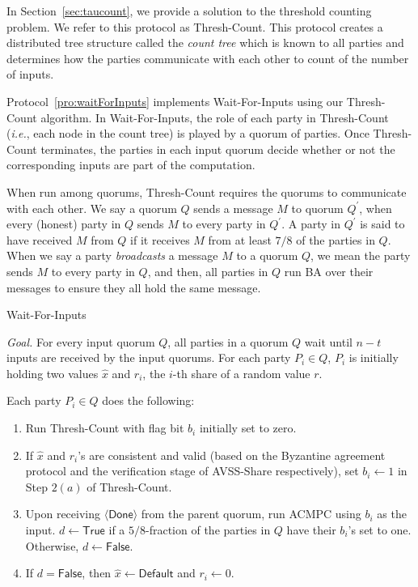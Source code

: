 \documentclass[11pt,letter]{article}
\newcommand{\ie}{\emph{i.e.}}
\newcommand{\alg}[1]{\mbox{\textsf{#1}}}
\newcommand{\mask}[1]{\widehat{#1}}
\theoremstyle{mytheoremstyle}
\let\savedCaption=\caption
\renewcommand*{\caption}[1]{\savedCaption[#1]{~#1}}
\newcommand{\algfont}{}
\newcommand{\fgoodq}{7/8\xspace}
\newcommand{\done}{$\langle\mathsf{Done}\rangle$\xspace}
\newcommand{\ba}{\mbox{\textsf{BA}}\xspace}
\begin{document}
In Section~\ref{sec:taucount}, we provide a solution to the threshold counting problem. We refer to this protocol as \alg{Thresh-Count}. This protocol creates a distributed tree structure called the \emph{count tree} which is known to all parties and determines how the parties communicate with each other to count of the number of inputs.

Protocol~\ref{pro:waitForInputs} implements \textsf{Wait-For-Inputs} using our \alg{Thresh-Count} algorithm. In \alg{Wait-For-Inputs}, the role of each party in \alg{Thresh-Count} (\ie, each node in the count tree) is played by a quorum of parties. Once \alg{Thresh-Count} terminates, the parties in each input quorum decide whether or not the corresponding inputs are part of the computation.

When run among quorums, \alg{Thresh-Count} requires the quorums to communicate with each other. We say a quorum $Q$ sends a message $M$ to quorum $Q^\prime$, when every (honest) party in $Q$ sends $M$ to every party in $Q^\prime$. A party in $Q^\prime$ is said to have received $M$ from $Q$ if it receives $M$ from at least $\fgoodq$ of the parties in $Q$. When we say a party \emph{broadcasts} a message $M$ to a quorum $Q$, we mean the party sends $M$ to every party in $Q$, and then, all parties in $Q$ run \ba over their messages to ensure they all hold the same message. 

\begin{algorithm}
	\caption{\alg{Wait-For-Inputs}}\label{pro:waitForInputs}
	\medskip
	\algfont
	\textit{Goal.} For every input quorum $Q$, all parties in a quorum $Q$ wait until $n-t$ inputs are received by the input quorums. For each party $P_i \in Q$, $P_i$ is initially
	holding two values $\mask{x}$ and $r_i$, the $i$-th share of a random value $r$.
	
	\medskip
	Each party $P_i \in Q$ does the following:
	\smallskip
	\begin{enumerate}
		\item Run \alg{Thresh-Count} with flag bit $b_i$ initially set to zero.
		
		\item If $\mask{x}$ and $r_i$'s are consistent and valid (based on the Byzantine agreement protocol and the verification stage of \alg{AVSS-Share} respectively), set $b_i \gets 1$ in Step $2(a)$ of \alg{Thresh-Count}.
		
		\item Upon receiving \done from the parent quorum, run \alg{ACMPC} using $b_i$ as the input. $d \gets \textsf{True}$ if a $5/8$-fraction of the parties in $Q$ have their $b_i$'s set to one. Otherwise, $d \gets \textsf{False}$.\label{ln:waitThreshCMPC}
		
		\item If $d = \textsf{False}$, then $\mask{x} \gets \textsf{Default}$ and $r_i \gets 0$.
	\end{enumerate}	
\end{algorithm}
\end{document}
